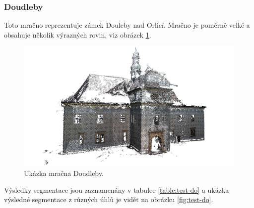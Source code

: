 \documentclass[11pt,twoside,a4paper]{book}
\begin{document}
\cleardoublepage
\subsubsection{Doudleby}

Toto mračno reprezentuje zámek Douleby nad Orlicí. Mračno je poměrně velké a obsahuje několik výrazných rovin, viz obrázek \ref{fig:doudleby}.

\begin{figure}[H]
\begin{center}
\includegraphics[width=\textwidth]{figures/doudleby}
\caption{Ukázka mračna Doudleby.}
\label{fig:doudleby}
\end{center}
\end{figure}

Výsledky segmentace jsou zaznamenány v tabulce \ref{table:test-do} a ukázka výsledné segmentace z různých úhlů je vidět na obrázku \ref{fig:test-do}.
\end{document}
